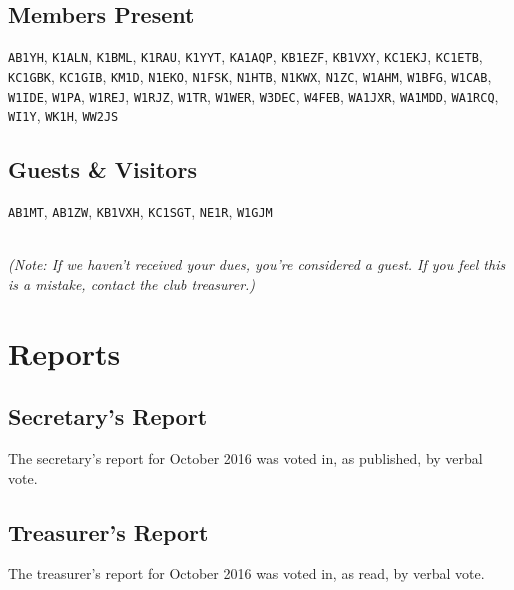 \documentclass[10pt,letterpaper]{article}
\begin{document}
\subsection{Members Present}

\texttt{AB1YH}, \texttt{K1ALN}, \texttt{K1BML}, \texttt{K1RAU}, \texttt{K1YYT}, \texttt{KA1AQP}, \texttt{KB1EZF}, \texttt{KB1VXY}, \texttt{KC1EKJ}, \texttt{KC1ETB}, \texttt{KC1GBK}, \texttt{KC1GIB}, \texttt{KM1D}, \texttt{N1EKO}, \texttt{N1FSK}, \texttt{N1HTB}, \texttt{N1KWX}, \texttt{N1ZC}, \texttt{W1AHM}, \texttt{W1BFG}, \texttt{W1CAB}, \texttt{W1IDE}, \texttt{W1PA}, \texttt{W1REJ}, \texttt{W1RJZ}, \texttt{W1TR}, \texttt{W1WER}, \texttt{W3DEC}, \texttt{W4FEB}, \texttt{WA1JXR}, \texttt{WA1MDD}, \texttt{WA1RCQ}, \texttt{WI1Y}, \texttt{WK1H}, \texttt{WW2JS}

\subsection{Guests \& Visitors}

\texttt{AB1MT}, \texttt{AB1ZW}, \texttt{KB1VXH}, \texttt{KC1SGT}, \texttt{NE1R}, \texttt{W1GJM}

\noindent\\
\emph{(Note: If we haven't received your dues, you're considered a guest. If you feel this is a mistake, contact the club treasurer.)}

\section{Reports}

\subsection{Secretary's Report}
The secretary's report for October 2016 was voted in, as published, by verbal vote.

\newpage
\subsection{Treasurer's Report}
The treasurer's report for October 2016 was voted in, as read, by verbal vote.
\end{document}
